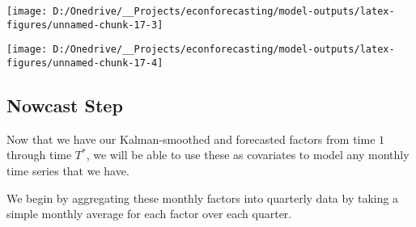 \documentclass[11pt, letterpaper]{article}\usepackage[]{graphicx}\usepackage[]{color}
\begin{document}
{\centering \texttt{[image: D:/Onedrive/\_\_Projects/econforecasting/model-outputs/latex-figures/unnamed-chunk-17-3]} 

}




{\centering \texttt{[image: D:/Onedrive/\_\_Projects/econforecasting/model-outputs/latex-figures/unnamed-chunk-17-4]} 

}





\subsection{Nowcast Step}
Now that we have our Kalman-smoothed and forecasted factors from time $1$ through time $T^*$, we will be able to use these as covariates to model any monthly time series that we have.

We begin by aggregating these monthly factors into quarterly data by taking a simple monthly average for each factor over each quarter.
\end{document}
